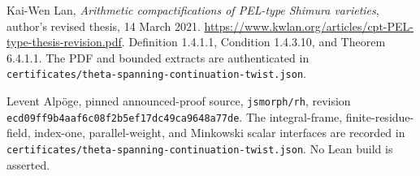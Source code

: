 Kai-Wen Lan, \emph{Arithmetic compactifications of PEL-type Shimura
varieties}, author's revised thesis, 14 March 2021.
\url{https://www.kwlan.org/articles/cpt-PEL-type-thesis-revision.pdf}.
Definition 1.4.1.1, Condition 1.4.3.10, and Theorem 6.4.1.1.
The PDF and bounded extracts are authenticated in
\texttt{certificates/theta-spanning-continuation-twist.json}.

Levent Alp\"oge, pinned announced-proof source,
\texttt{jsmorph/rh}, revision
\texttt{ecd09ff9b4aaf6c08f2b5ef17dc49ca9648a77de}.
The integral-frame, finite-residue-field, index-one, parallel-weight,
and Minkowski scalar interfaces are recorded in
\texttt{certificates/theta-spanning-continuation-twist.json}.
No Lean build is asserted.
